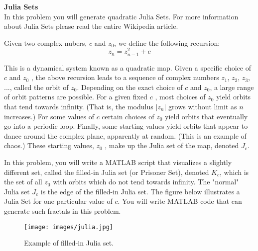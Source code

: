 \documentclass[12pt]{TDTP}
\begin{document}
\Exo
\textbf{Julia Sets}\\
In this problem you will generate quadratic Julia Sets. 
For more information about Julia Sets please read the entire  Wikipedia article.

Given two complex nubers, $c$ and $z_0$, we define the following recursion:
$$
z_n = z_{n-1}^2 +c
$$

This is a dynamical system known as a quadratic map. Given a specific choice of $c$ and $z_0$ , the above recursion leads to a sequence of complex numbers $z_1$, $z_2$, $z_3$, ..., called the orbit of $z_0$.
Depending on the exact choice of $c$ and $z_0$, a large range of orbit patterns are possible. 
For a given fixed $c$ , most choices of $z_0$ yield orbits that tend towards infinity. (That is, the modulus $|z_n|$ grows without limit as $n$ increases.)
For some values of $c$ certain choices of $z_0$ yield orbits that eventually go into a periodic loop. Finally, some starting values yield orbits that appear to dance around the complex plane, apparently at random. (This is an example of chaos.) 
These starting values, $z_0$ , make up the Julia set of the map, denoted $J_c$. 

In this problem, you will write a MATLAB script that visualizes a slightly different set, called the filled-in Julia set (or Prisoner Set), denoted $K_c$, which is the set of all $z_0$ with orbits which do not tend towards infinity.
The "normal" Julia set $J_c$ is the edge of the filled-in Julia set. The figure below illustrates a Julia Set for one particular value of $c$.
You will write MATLAB code that can generate such fractals in this problem.

\begin{figure}[h!]
\begin{center}
\texttt{[image: images/julia.jpg]}
\caption{Example of filled-in Julia set.}
\end{center}
\end{figure}
\end{document}
